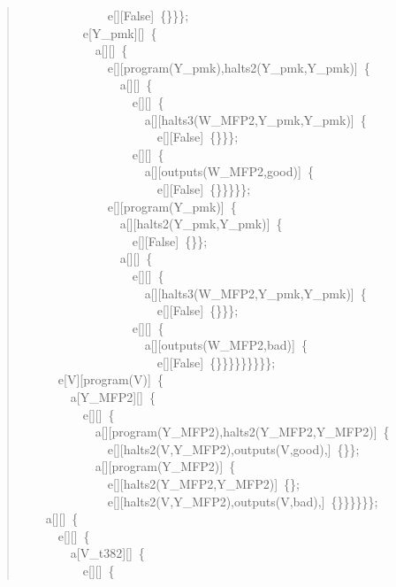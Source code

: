 \begin{quote}
{~~~~~~~~~~~~~~e[][False]~\{\}\}\};\\
~~~~~~~~~~e[Y\_pmk][]~\{\\
~~~~~~~~~~~~a[][]~\{\\
~~~~~~~~~~~~~~e[][program(Y\_pmk),halts2(Y\_pmk,Y\_pmk)]~\{\\
~~~~~~~~~~~~~~~~a[][]~\{\\
~~~~~~~~~~~~~~~~~~e[][]~\{\\
~~~~~~~~~~~~~~~~~~~~a[][halts3(W\_MFP2,Y\_pmk,Y\_pmk)]~\{\\
~~~~~~~~~~~~~~~~~~~~~~e[][False]~\{\}\}\};\\
~~~~~~~~~~~~~~~~~~e[][]~\{\\
~~~~~~~~~~~~~~~~~~~~a[][outputs(W\_MFP2,good)]~\{\\
~~~~~~~~~~~~~~~~~~~~~~e[][False]~\{\}\}\}\}\};\\
~~~~~~~~~~~~~~e[][program(Y\_pmk)]~\{\\
~~~~~~~~~~~~~~~~a[][halts2(Y\_pmk,Y\_pmk)]~\{\\
~~~~~~~~~~~~~~~~~~e[][False]~\{\}\};\\
~~~~~~~~~~~~~~~~a[][]~\{\\
~~~~~~~~~~~~~~~~~~e[][]~\{\\
~~~~~~~~~~~~~~~~~~~~a[][halts3(W\_MFP2,Y\_pmk,Y\_pmk)]~\{\\
~~~~~~~~~~~~~~~~~~~~~~e[][False]~\{\}\}\};\\
~~~~~~~~~~~~~~~~~~e[][]~\{\\
~~~~~~~~~~~~~~~~~~~~a[][outputs(W\_MFP2,bad)]~\{\\
~~~~~~~~~~~~~~~~~~~~~~e[][False]~\{\}\}\}\}\}\}\}\}\};\\
~~~~~~e[V][program(V)]~\{\\
~~~~~~~~a[Y\_MFP2][]~\{\\
~~~~~~~~~~e[][]~\{\\
~~~~~~~~~~~~a[][program(Y\_MFP2),halts2(Y\_MFP2,Y\_MFP2)]~\{\\
~~~~~~~~~~~~~~e[][halts2(V,Y\_MFP2),outputs(V,good),]~\{\}\};\\
~~~~~~~~~~~~a[][program(Y\_MFP2)]~\{\\
~~~~~~~~~~~~~~e[][halts2(Y\_MFP2,Y\_MFP2)]~\{\};\\
~~~~~~~~~~~~~~e[][halts2(V,Y\_MFP2),outputs(V,bad),]~\{\}\}\}\}\}\};\\
~~~~a[][]~\{\\
~~~~~~e[][]~\{\\
~~~~~~~~a[V\_t382][]~\{\\
~~~~~~~~~~e[][]~\{\\
}
\end{quote}
